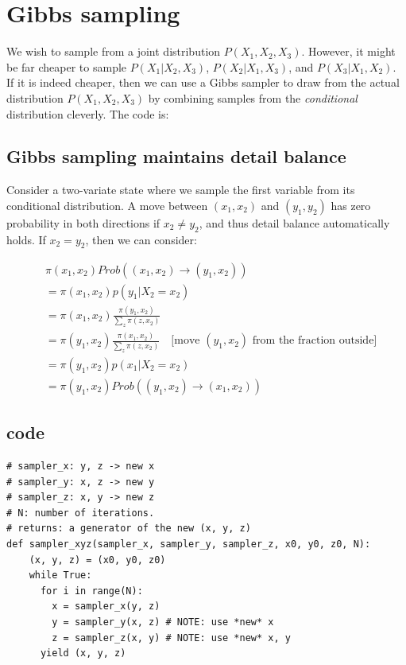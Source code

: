 \documentclass[titlepage]{article}
\begin{document}
\section{Gibbs sampling}
We wish to sample from a joint distribution $P(X_1, X_2, X_3)$. However, it might
be far cheaper to sample $P(X_1 | X_2, X_3)$, $P(X_2 | X_1, X_3)$, and
$P(X_3 | X_1, X_2)$. If it is indeed cheaper, then we can use a Gibbs sampler
to draw from the actual distribution $P(X_1, X_2, X_3)$ by combining samples
from the \emph{conditional} distribution cleverly. The code is:


\subsection{Gibbs sampling maintains detail balance}
Consider a two-variate state where we sample the first variable from its conditional distribution.
A move between  $(x_1, x_2)$ and $(y_1, y_2)$ has zero probability in both directions
if $x_2\neq y_2$, and thus detail balance automatically holds. If $x_2 = y_2$, then
we can consider:


\begin{align*}
&\pi(x_1, x_2)  Prob((x_1, x_2) \rightarrow (y_1, x_2)) \\
&= \pi(x_1, x_2) p(y_1 | X_2 = x_2) \\
&= \pi(x_1, x_2) \frac{\pi(y_1, x_2)}{\sum_z \pi(z, x_2)} \\
&= \pi(y_1, x_2) \frac{\pi(x_1, x_2)}{\sum_z \pi(z, x_2)} \quad \text{[move $(y_1, x_2)$ from the fraction outside]} \\
&=\pi(y_1, x_2) p(x_1 | X_2 = x_2) \\
&= \pi(y_1, x_2) Prob((y_1, x_2) \rightarrow (x_1, x_2))
\end{align*}

\subsection{code}
\begin{verbatim}
# sampler_x: y, z -> new x
# sampler_y: x, z -> new y
# sampler_z: x, y -> new z
# N: number of iterations.
# returns: a generator of the new (x, y, z)
def sampler_xyz(sampler_x, sampler_y, sampler_z, x0, y0, z0, N):
    (x, y, z) = (x0, y0, z0)
    while True:
      for i in range(N):
        x = sampler_x(y, z)
        y = sampler_y(x, z) # NOTE: use *new* x
        z = sampler_z(x, y) # NOTE: use *new* x, y
      yield (x, y, z)
\end{verbatim}
\end{document}
